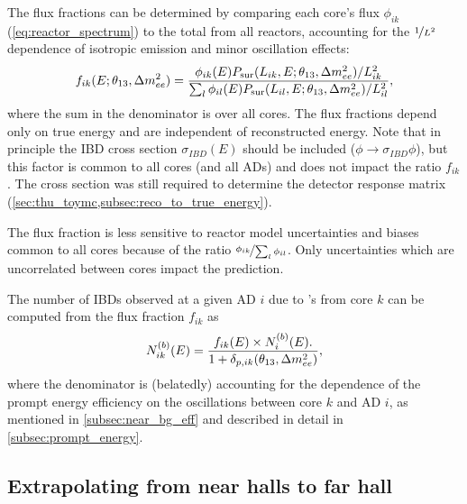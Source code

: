 The flux fractions can be determined
by comparing each core's \nuebar{} flux $\phi_{ik}$ (\cref{eq:reactor_spectrum})
to the total from all reactors,
accounting for the $\nicefrac{1}{L^2}$ dependence of isotropic \nuebar{} emission
and minor oscillation effects:
\begin{equation}\label{eq:flux_fraction}
    f_{ik}(E;\theta_{13},\Delta m^2_{ee}) = \frac{
        \phi_{ik}(E) P_\text{sur} (L_{ik}, E;\theta_{13},\Delta m^2_{ee})/L_{ik}^2
    }{
        \sum_l \phi_{il}(E)P_\text{sur}(L_{il}, E;\theta_{13},\Delta m^2_{ee})/L_{il}^2
    },
\end{equation}
where the sum in the denominator is over all cores.
The flux fractions depend only on true \nuebar{} energy
and are independent of reconstructed energy.
Note that in principle the IBD cross section $\sigma_{IBD}(E)$
should be included ($\phi \to \sigma_{IBD}\phi$),
but this factor is common to all cores (and all ADs)
and does not impact the ratio $f_{ik}$.
The cross section was still required to determine the detector response matrix
(\cref{sec:thu_toymc,subsec:reco_to_true_energy}).

The flux fraction is less sensitive to reactor \nuebar{} model uncertainties and biases
common to all cores
because of the ratio $\nicefrac{\phi_{ik}}{\sum_l\phi_{il}}$.
Only uncertainties which are uncorrelated between cores
impact the prediction.

The number of IBDs observed at a given AD $i$ due to \nuebar{}'s from core $k$
can be computed from the flux fraction $f_{ik}$ as
\begin{equation}\label{eq:num_ibds_from_core_ij}
    N_{ik}^{(b)}(E) = \frac{
        f_{ik}(E) \times N_i^{(b)}(E).
    }{
        1 + \delta_{p,ik}(\theta_{13}, \Delta m^2_{ee})
    },
\end{equation}
where the denominator is (belatedly) accounting for the dependence
of the prompt energy efficiency on the \nuebar{} oscillations
between core $k$ and AD $i$,
as mentioned in \cref{subsec:near_bg_eff}
and described in detail in \cref{subsec:prompt_energy}.

\subsection{Extrapolating from near halls to far hall}
\label{subsec:extrapolation}

